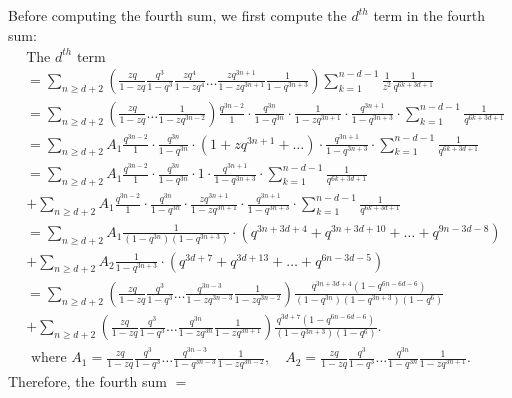 \documentclass[draft]{amsart}
\numberwithin{equation}{section}
\theoremstyle{plain}
\theoremstyle{remark}
\begin{document}
Before computing the fourth sum, we first compute the $d^{th}$ term in the fourth sum:
\begin{align*}
&\mbox{The $d^{th}$ term}\\
&=\sum_{n\geq d+2}\left(\frac{zq}{1-zq}\frac{q^{3}}{1-q^{3}} \frac{zq^{4}}{1-zq^{4}}\dots\frac{zq^{3n+1}}{1-zq^{3n+1}}\frac{1}{1-q^{3n+3}}\right)
\sum_{k=1}^{n-d-1}\frac{1}{z^{2}}\frac{1}{q^{6k+3d+1}}\\
&=\sum_{n\geq d+2}\left(\frac{zq}{1-zq}\dots\frac{1}{1-zq^{3n-2}}\right)\frac{q^{3n-2}}{1}\cdot\frac{q^{3n}}{1-q^{3n}}\cdot\frac{1}{1-zq^{3n+1}}\cdot\frac{q^{3n+1}}{1-q^{3n+3}}\cdot\sum_{k=1}^{n-d-1}\frac{1}{q^{6k+3d+1}}\\
&=\sum_{n\geq d+2}A_{1}\frac{q^{3n-2}}{1}\cdot\frac{q^{3n}}{1-q^{3n}}\cdot(1+zq^{3n+1}+\dots)\cdot\frac{q^{3n+1}}{1-q^{3n+3}}\cdot\sum_{k=1}^{n-d-1}\frac{1}{q^{6k+3d+1}}\\
&=\sum_{n\geq d+2}A_{1}\frac{q^{3n-2}}{1}\cdot\frac{q^{3n}}{1-q^{3n}}\cdot1\cdot\frac{q^{3n+1}}{1-q^{3n+3}}\cdot\sum_{k=1}^{n-d-1}\frac{1}{q^{6k+3d+1}}\\
&+\sum_{n\geq d+2}A_{1}\frac{q^{3n-2}}{1}\cdot\frac{q^{3n}}{1-q^{3n}}\cdot\frac{zq^{3n+1}}{1-zq^{3n+1}}\cdot\frac{q^{3n+1}}{1-q^{3n+3}}\cdot\sum_{k=1}^{n-d-1}\frac{1}{q^{6k+3d+1}}\\
&=\sum_{n\geq d+2}A_{1}\frac{1}{(1-q^{3n})(1-q^{3n+3})}\cdot\left(q^{3n+3d+4}   +q^{3n+3d+10}+\dots +q^{9n-3d-8}
\right)\\
&+\sum_{n\geq d+2}A_{2}\frac{1}{1-q^{3n+3}}\cdot\left( q^{3d+7} +q^{3d+13}   +\dots+q^{6n-3d-5}      \right)\\
&=\sum_{n\geq d+2}\left(\frac{zq}{1-zq}\frac{q^{3}}{1-q^{3}}\dots\frac{q^{3n-3}}{1-zq^{3n-3}}\frac{1}{1-zq^{3n-2}}\right)\frac{q^{3n+3d+4}(1-q^{6n-6d-6})}{(1-q^{3n})(1-q^{3n+3})(1-q^{6})}\\
&+\sum_{n\geq d+2}\left(\frac{zq}{1-zq}\frac{q^{3}}{1-q^{3}}\dots\frac{q^{3n}}{1-zq^{3n}}\frac{1}{1-zq^{3n+1}}\right)\frac{q^{3d+7}(1-q^{6n-6d-6})}{(1-q^{3n+3})(1-q^{6})}.\\
&\mbox{ where }A_{1}=\frac{zq}{1-zq}\frac{q^{3}}{1-q^{3}} \dots\frac{q^{3n-3}}{1-q^{3n-3}}\frac{1}{1-zq^{3n-2}},\quad
A_{2}=\frac{zq}{1-zq}\frac{q^{3}}{1-q^{3}}\dots\frac{q^{3n}}{1-q^{3n}}\frac{1}{1-zq^{3n+1}}.
\end{align*}
Therefore, the fourth sum $=$ 
\end{document}
